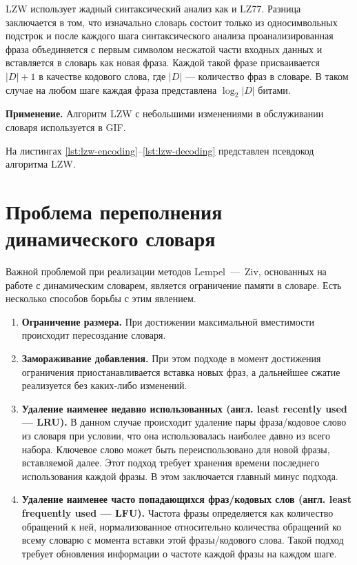 LZW использует жадный синтаксический анализ как и LZ77.
Разница заключается в том, что изначально словарь состоит только из односимвольных подстрок и после каждого шага синтаксического анализа проанализированная фраза объединяется с первым символом несжатой части входных данных и вставляется в словарь как новая фраза.
Каждой такой фразе присваивается $|D| + 1$ в качестве кодового слова, где $|D|$ --- количество фраз в словаре.
В таком случае на любом шаге каждая фраза представлена $\log_2{|D|}$ битами.

\textbf{Применение.} Алгоритм LZW с небольшими изменениями в обслуживании словаря используется в GIF.

На листингах \ref{lst:lzw-encoding}--\ref{lst:lzw-decoding} представлен псевдокод алгоритма LZW.

\section{Проблема переполнения динамического словаря}

Важной проблемой при реализации методов Lempel~---~Ziv, основанных на работе с динамическим словарем, является ограничение памяти в словаре.
Есть несколько способов борьбы с этим явлением.

\begin{enumerate}
    \item \textbf{Ограничение размера.} 
    При достижении максимальной вместимости происходит пересоздание словаря.
    \item \textbf{Замораживание добавления.}
    При этом подходе в момент достижения ограничения приостанавливается вставка новых фраз, а дальнейшее сжатие реализуется без каких-либо изменений.
    \item \textbf{Удаление наименее недавно использованных (англ. least recently used --- LRU).}
    В данном случае происходит удаление пары фраза/кодовое слово из словаря при условии, что она использовалась наиболее давно из всего набора.
    Ключевое слово может быть переиспользовано для новой фразы, вставляемой далее.
    Этот подход требует хранения времени последнего использования каждой фразы.
    В этом заключается главный минус подхода.
    \item \textbf{Удаление наименее часто попадающихся фраз/кодовых слов (англ. least frequently used --- LFU).}
    Частота фразы определяется как количество обращений к ней, нормализованное относительно количества обращений ко всему словарю с момента вставки этой фразы/кодового слова.
    Такой подход требует обновления информации о частоте каждой фразы на каждом шаге.
\end{enumerate}
